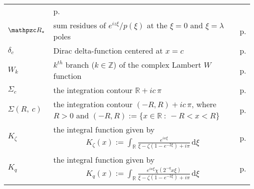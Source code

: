 \documentclass[../dissertation.tex]{subfiles}
\begin{document}
\begin{centering}
\begin{longtable}{R{.115\textwidth}|L{.74\textwidth}|C{.145\textwidth}}
{				}
			& p.\pageref{sym1:Rcal} \\
		$\mathpzc R_\star$ & sum residues of $e^{iz\xi}/p(\xi)$ at the $\xi=0$ and $\xi=\lambda$ 
				poles 
			& p.\pageref{sym1:ressum} \\
		$\delta_c$ & Dirac delta-function centered at $x=c$ 
			& p.\pageref{sym:dirac} \\
		$W_k$ & $k^{th}$ branch ($k \in \mathbb Z$) of the complex Lambert $W$ function
			& p.\pageref{sym1:Wk} \\
		$\Sigma_{c}$ & the integration contour
				$\mathbb R + i c \, \pi$
			& p.\pageref{sym1:SigRealLine} \\
		$\Sigma(R,~c)$ & the integration contour $(-R, R) + i c \,\pi$,
				where $R > 0$ and $(-R, R):= \{x \in \mathbb R ~:~ -R < x < R\}$
			& p.\pageref{sym1:SigR} \\
		$K_\zeta$ & the integral function given by 
				{
					\begin{align*}
						K_\zeta(x) 
							:= \int_{\mathbb R} 
								\frac{e^{ix \xi}}{\xi - \zeta\left(1-e^{-2\xi}\right)+i\pi}
							\, \mathrm{d}\xi
					\end{align*}
				}
			& p.\pageref{sym1:Kzeta} \\
		$K_q$ & the integral function given by 
				{
					\begin{align*}
						K_q(x) 
							:= \int_{\mathbb R} 
								\frac{e^{ix\xi} \chi\left( 2^{-q} x \xi\right)}
									{\xi - \zeta\left(1-e^{-2\xi}\right)+i\pi}
							\, \mathrm{d}\xi
					\end{align*}
				}
			& p.\pageref{sym1:Kq} \\
	\end{longtable}
\end{centering}



\newpage
\end{document}

